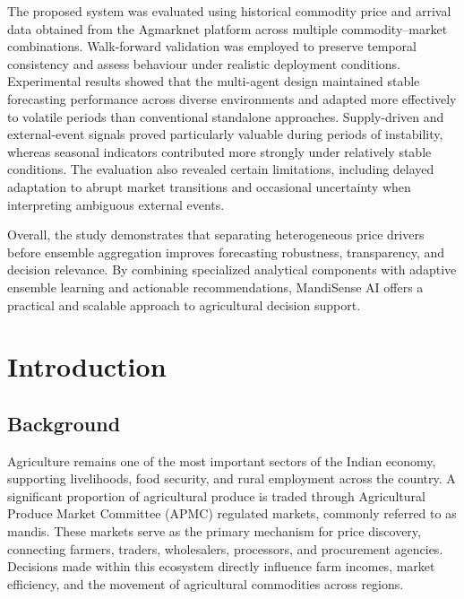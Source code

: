 \documentclass[12pt,a4paper]{report}
\theoremstyle{definition}
\theoremstyle{remark}
\begin{document}
The proposed system was evaluated using historical commodity price and arrival data obtained from the Agmarknet platform across multiple commodity--market combinations. Walk-forward validation was employed to preserve temporal consistency and assess behaviour under realistic deployment conditions. Experimental results showed that the multi-agent design maintained stable forecasting performance across diverse environments and adapted more effectively to volatile periods than conventional standalone approaches. Supply-driven and external-event signals proved particularly valuable during periods of instability, whereas seasonal indicators contributed more strongly under relatively stable conditions. The evaluation also revealed certain limitations, including delayed adaptation to abrupt market transitions and occasional uncertainty when interpreting ambiguous external events.

Overall, the study demonstrates that separating heterogeneous price drivers before ensemble aggregation improves forecasting robustness, transparency, and decision relevance. By combining specialized analytical components with adaptive ensemble learning and actionable recommendations, MandiSense AI offers a practical and scalable approach to agricultural decision support.

\vspace{1em}

\newpage
\pagestyle{chapterstyle}

\chapter{Introduction}
\label{chap:introduction}

\section{Background}

Agriculture remains one of the most important sectors of the Indian economy, supporting livelihoods, food security, and rural employment across the country. A significant proportion of agricultural produce is traded through Agricultural Produce Market Committee (APMC) regulated markets, commonly referred to as mandis. These markets serve as the primary mechanism for price discovery, connecting farmers, traders, wholesalers, processors, and procurement agencies. Decisions made within this ecosystem directly influence farm incomes, market efficiency, and the movement of agricultural commodities across regions.
\end{document}
